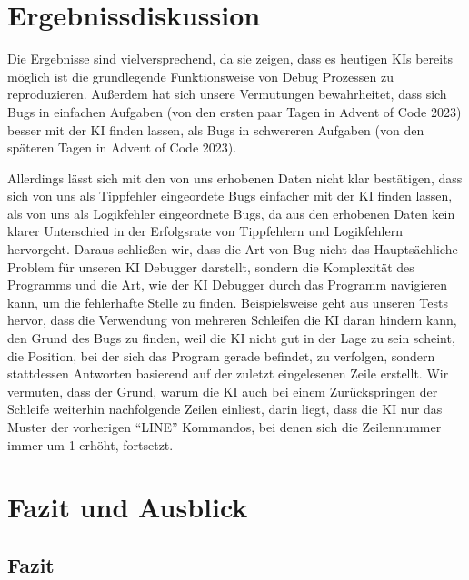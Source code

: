 \documentclass[a4paper,12pt,ngerman]{scrartcl}
\begin{document}
\section{Ergebnissdiskussion}

Die Ergebnisse sind vielversprechend, da sie zeigen, dass es heutigen KIs bereits möglich ist die grundlegende Funktionsweise von Debug Prozessen zu reproduzieren. Außerdem hat sich unsere Vermutungen bewahrheitet, dass sich Bugs in einfachen Aufgaben (von den ersten paar Tagen in Advent of Code 2023) besser mit der KI finden lassen, als Bugs in schwereren Aufgaben (von den späteren Tagen in Advent of Code 2023).

Allerdings lässt sich mit den von uns erhobenen Daten nicht klar bestätigen, dass sich von uns als Tippfehler eingeordete Bugs einfacher mit der KI finden lassen, als von uns als Logikfehler eingeordnete Bugs, da aus den erhobenen Daten kein klarer Unterschied in der Erfolgsrate von Tippfehlern und Logikfehlern hervorgeht. Daraus schließen wir, dass die Art von Bug nicht das Hauptsächliche Problem für unseren KI Debugger darstellt, sondern die Komplexität des Programms und die Art, wie der KI Debugger durch das Programm navigieren kann, um die fehlerhafte Stelle zu finden. Beispielsweise geht aus unseren Tests hervor, dass die Verwendung von mehreren Schleifen die KI daran hindern kann, den Grund des Bugs zu finden, weil die KI nicht gut in der Lage zu sein scheint, die Position, bei der sich das Program gerade befindet, zu verfolgen, sondern stattdessen Antworten basierend auf der zuletzt eingelesenen Zeile erstellt. Wir vermuten, dass der Grund, warum die KI auch bei einem Zurückspringen der Schleife weiterhin nachfolgende Zeilen einliest, darin liegt, dass die KI nur das Muster der vorherigen ``LINE'' Kommandos, bei denen sich die Zeilennummer immer um 1 erhöht, fortsetzt.

\section{Fazit und Ausblick}

\subsection{Fazit}
\end{document}

